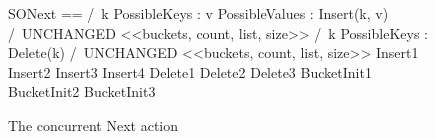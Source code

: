\documentclass{uit-thesis}
\begin{document}
\begin{figure}
    \begin{tla}
        SONext ==
        \/  /\ \E k \in PossibleKeys :
                 \E v \in PossibleValues :
                    Insert(k, v)
            /\ UNCHANGED <<buckets, count, list, size>>
        \/  /\ \E k \in PossibleKeys :
                Delete(k)
            /\ UNCHANGED <<buckets, count, list, size>>
        \/ Insert1
        \/ Insert2
        \/ Insert3
        \/ Insert4
        \/ Delete1
        \/ Delete2
        \/ Delete3
        \/ BucketInit1
        \/ BucketInit2
        \/ BucketInit3
    \end{tla}
\begin{tlatex}
%
%
%
%
%
%
%
%
%
%
%
%
%
%
%
%
\end{tlatex}
    \caption{The concurrent Next action}
    \label{fig:concurrent-next}
\end{figure}
\end{document}
